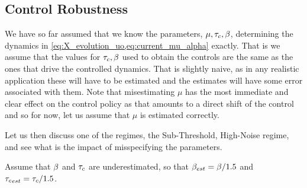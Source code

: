 \documentclass[12pt]{iopart}
\begin{document}
% 

\subsection{Control Robustness}
We have so far assumed that we know the parameters, ${\mu }, { \tau_{c} }, {\beta}$, determining
the dynamics in \cref{eq:X_evolution_uo,eq:current_mu_alpha} exactly. That is we
assume that the values for ${ \tau_{c} }, {\beta}$ used to obtain the controls are the same as the ones that drive the
controlled dynamics. That is slightly naive, as in any realistic application
these will have to be estimated and the estimates will have some error
associated with them.
Note that misestimating $\mu$ has the most immediate and clear effect on the
control policy as that amounts to a direct shift of the control and so for now,
let us assume that $\mu$ is estimated correctly.

Let us then discuss one of the regimes, the Sub-Threshold,
High-Noise regime, and see what is the impact of misspecifying the parameters.

Assume that ${\beta}$ and ${ \tau_{c} }$ are underestimated, so that ${\beta}_{est} = {\beta} / 1.5$
and ${ \tau_{c} }_{est} = { \tau_{c} } / 1.5$.
\end{document}
